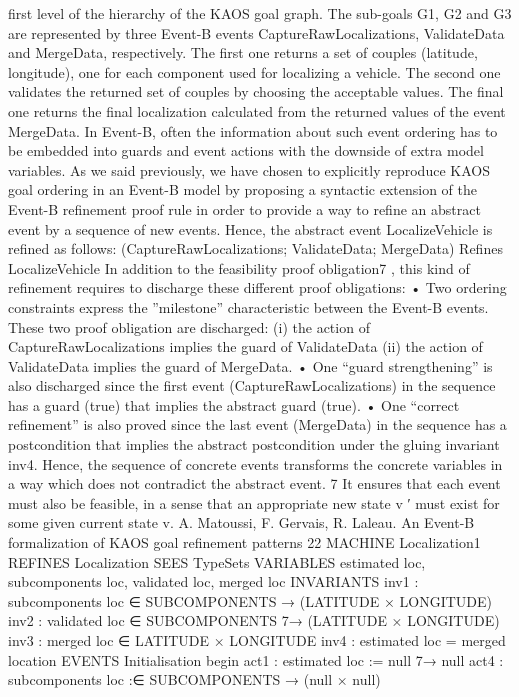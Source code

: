 first level of the hierarchy of the KAOS goal graph. The sub-goals G1, G2 and G3 are represented by three Event-B events CaptureRawLocalizations, ValidateData and MergeData, respectively. The first one returns a set of couples (latitude, longitude), one for each
component used for localizing a vehicle. The second one validates the returned set of couples
by choosing the acceptable values. The final one returns the final localization calculated from
the returned values of the event MergeData.
In Event-B, often the information about such event ordering has to be embedded into
guards and event actions with the downside of extra model variables. As we said previously,
we have chosen to explicitly reproduce KAOS goal ordering in an Event-B model by proposing
a syntactic extension of the Event-B refinement proof rule in order to provide a way to refine
an abstract event by a sequence of new events. Hence, the abstract event LocalizeVehicle
is refined as follows:
(CaptureRawLocalizations; ValidateData; MergeData) Refines LocalizeVehicle
In addition to the feasibility proof obligation7
, this kind of refinement requires to discharge
these different proof obligations:
• Two ordering constraints express the ”milestone” characteristic between the Event-B
events. These two proof obligation are discharged: (i) the action of CaptureRawLocalizations implies the guard of ValidateData (ii) the action of ValidateData implies the guard of MergeData.
• One “guard strengthening” is also discharged since the first event (CaptureRawLocalizations)
in the sequence has a guard (true) that implies the abstract guard (true).
• One “correct refinement” is also proved since the last event (MergeData) in the sequence has a postcondition that implies the abstract postcondition under the gluing
invariant inv4. Hence, the sequence of concrete events transforms the concrete variables in a way which does not contradict the abstract event.
7
It ensures that each event must also be feasible, in a sense that an appropriate new state v
′ must exist for
some given current state v.
A. Matoussi, F. Gervais, R. Laleau. An Event-B formalization of KAOS goal refinement patterns 22
MACHINE Localization1
REFINES Localization
SEES TypeSets
VARIABLES
estimated loc, subcomponents loc, validated loc, merged loc
INVARIANTS
inv1 : subcomponents loc ∈ SUBCOMPONENTS → (LATITUDE × LONGITUDE)
inv2 : validated loc ∈ SUBCOMPONENTS 7→ (LATITUDE × LONGITUDE)
inv3 : merged loc ∈ LATITUDE × LONGITUDE
inv4 : estimated loc = merged location
EVENTS
Initialisation
begin
act1 : estimated loc := null 7→ null
act4 : subcomponents loc :∈ SUBCOMPONENTS → ({null} × {null})

